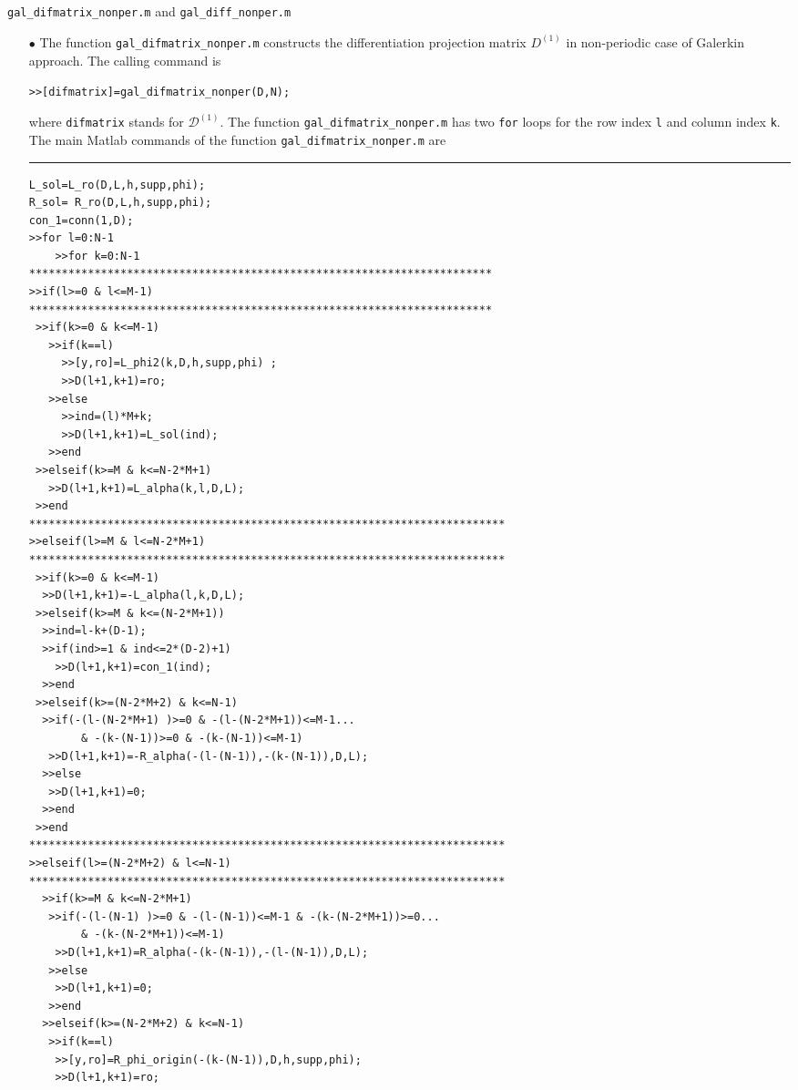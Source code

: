 \documentclass[acmtoms]{acmtrans2m}
\begin{document}
\section{} \verb#gal_difmatrix_nonper.m# and \verb#gal_diff_nonper.m#
\begin{itemize}
\item[$\bullet$]
The function \verb#gal_difmatrix_nonper.m# constructs the differentiation projection matrix $D^{(1)}$ in non-periodic case of Galerkin approach.
The calling command is
\begin{alltt}
>>[difmatrix]=gal_difmatrix_nonper(D,N);
\end{alltt}
where \verb#difmatrix# stands for $\mathcal{D}^{(1)}$. The function \verb#gal_difmatrix_nonper.m# has two \verb#for# loops for the row index \verb#l# and column index \verb#k#.
The main Matlab commands of the function \verb#gal_difmatrix_nonper.m# are
\\\hrule
\begin{verbatim}
L_sol=L_ro(D,L,h,supp,phi);
R_sol= R_ro(D,L,h,supp,phi);
con_1=conn(1,D);
>>for l=0:N-1
    >>for k=0:N-1
***********************************************************************
>>if(l>=0 & l<=M-1)
***********************************************************************
 >>if(k>=0 & k<=M-1)
   >>if(k==l)
     >>[y,ro]=L_phi2(k,D,h,supp,phi) ;
     >>D(l+1,k+1)=ro;
   >>else
     >>ind=(l)*M+k;
     >>D(l+1,k+1)=L_sol(ind);
   >>end
 >>elseif(k>=M & k<=N-2*M+1)
   >>D(l+1,k+1)=L_alpha(k,l,D,L);
 >>end
*************************************************************************
>>elseif(l>=M & l<=N-2*M+1)
*************************************************************************
 >>if(k>=0 & k<=M-1)
  >>D(l+1,k+1)=-L_alpha(l,k,D,L);
 >>elseif(k>=M & k<=(N-2*M+1))
  >>ind=l-k+(D-1);
  >>if(ind>=1 & ind<=2*(D-2)+1)
    >>D(l+1,k+1)=con_1(ind);
  >>end
 >>elseif(k>=(N-2*M+2) & k<=N-1)
  >>if(-(l-(N-2*M+1) )>=0 & -(l-(N-2*M+1))<=M-1...
        & -(k-(N-1))>=0 & -(k-(N-1))<=M-1)
   >>D(l+1,k+1)=-R_alpha(-(l-(N-1)),-(k-(N-1)),D,L);
  >>else
   >>D(l+1,k+1)=0;
  >>end
 >>end
*************************************************************************
>>elseif(l>=(N-2*M+2) & l<=N-1)
*************************************************************************
  >>if(k>=M & k<=N-2*M+1)
   >>if(-(l-(N-1) )>=0 & -(l-(N-1))<=M-1 & -(k-(N-2*M+1))>=0...
        & -(k-(N-2*M+1))<=M-1)
    >>D(l+1,k+1)=R_alpha(-(k-(N-1)),-(l-(N-1)),D,L);
   >>else
    >>D(l+1,k+1)=0;
   >>end
  >>elseif(k>=(N-2*M+2) & k<=N-1)
   >>if(k==l)
    >>[y,ro]=R_phi_origin(-(k-(N-1)),D,h,supp,phi);
    >>D(l+1,k+1)=ro;

\end{verbatim}
\end{itemize}
\end{document}
